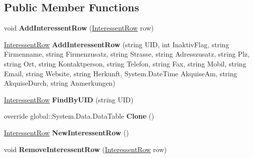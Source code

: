 \subsection*{Public Member Functions}
\begin{DoxyCompactItemize}
\item 
void {\bfseries Add\+Interessent\+Row} (\hyperlink{class_products_1_1_data_1_1ds_sage_1_1_interessent_row}{Interessent\+Row} row)\hypertarget{class_products_1_1_data_1_1ds_sage_1_1_interessent_data_table_a758e5324e3220ae8b56344a8ab378d40}{}\label{class_products_1_1_data_1_1ds_sage_1_1_interessent_data_table_a758e5324e3220ae8b56344a8ab378d40}

\item 
\hyperlink{class_products_1_1_data_1_1ds_sage_1_1_interessent_row}{Interessent\+Row} {\bfseries Add\+Interessent\+Row} (string U\+ID, int Inaktiv\+Flag, string Firmenname, string Firmenzusatz, string Strasse, string Adresszusatz, string Plz, string Ort, string Kontaktperson, string Telefon, string Fax, string Mobil, string Email, string Website, string Herkunft, System.\+Date\+Time Akquise\+Am, string Akquise\+Durch, string Anmerkungen)\hypertarget{class_products_1_1_data_1_1ds_sage_1_1_interessent_data_table_a4fc8cce027c67281b6214e702c37debc}{}\label{class_products_1_1_data_1_1ds_sage_1_1_interessent_data_table_a4fc8cce027c67281b6214e702c37debc}

\item 
\hyperlink{class_products_1_1_data_1_1ds_sage_1_1_interessent_row}{Interessent\+Row} {\bfseries Find\+By\+U\+ID} (string U\+ID)\hypertarget{class_products_1_1_data_1_1ds_sage_1_1_interessent_data_table_ad4c71d2595b14ffc5531d13603501ecf}{}\label{class_products_1_1_data_1_1ds_sage_1_1_interessent_data_table_ad4c71d2595b14ffc5531d13603501ecf}

\item 
override global\+::\+System.\+Data.\+Data\+Table {\bfseries Clone} ()\hypertarget{class_products_1_1_data_1_1ds_sage_1_1_interessent_data_table_afac4b429ad3f6394f4ffb9cb128e97fe}{}\label{class_products_1_1_data_1_1ds_sage_1_1_interessent_data_table_afac4b429ad3f6394f4ffb9cb128e97fe}

\item 
\hyperlink{class_products_1_1_data_1_1ds_sage_1_1_interessent_row}{Interessent\+Row} {\bfseries New\+Interessent\+Row} ()\hypertarget{class_products_1_1_data_1_1ds_sage_1_1_interessent_data_table_a6b40ed83a4061268621d3bec5fe3603d}{}\label{class_products_1_1_data_1_1ds_sage_1_1_interessent_data_table_a6b40ed83a4061268621d3bec5fe3603d}

\item 
void {\bfseries Remove\+Interessent\+Row} (\hyperlink{class_products_1_1_data_1_1ds_sage_1_1_interessent_row}{Interessent\+Row} row)\hypertarget{class_products_1_1_data_1_1ds_sage_1_1_interessent_data_table_a96c4a22029586c8a8cd8cc2b3955cb80}{}\label{class_products_1_1_data_1_1ds_sage_1_1_interessent_data_table_a96c4a22029586c8a8cd8cc2b3955cb80}

\end{DoxyCompactItemize}
